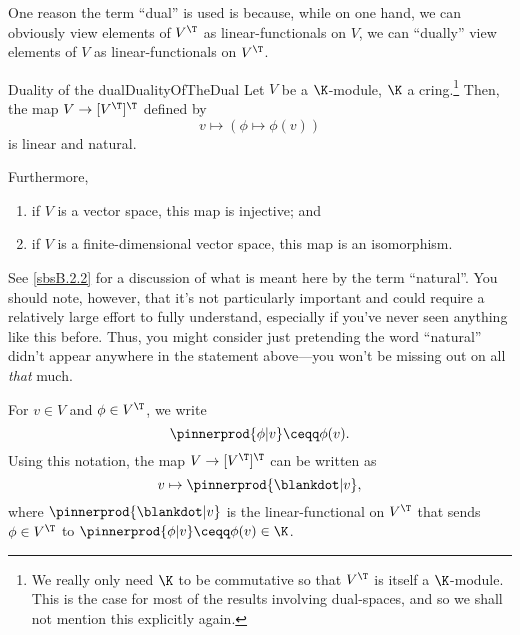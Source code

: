 One reason the term ``dual'' is used is because, while on one hand, we can obviously view elements of $V^{\T}$ as linear-functionals on $V$, we can ``dually'' view elements of $V$ as linear-functionals on $V^{\T}$.
\begin{thm}{Duality of the dual}{DualityOfTheDual}
	Let $V$ be a $\K$-module, $\K$ a cring.\footnote{We really only need $\K$ to be commutative so that $V^{\T}$ is itself a $\K$-module.  This is the case for most of the results involving dual-spaces, and so we shall not mention this explicitly again.}  Then, the map $V\rightarrow [V^{\T}]^{\T}$ defined by
	\begin{equation}
		v\mapsto (\phi \mapsto \phi (v))
	\end{equation}
	is linear and natural.
	
	Furthermore,
	\begin{enumerate}
		\item \label{DualityOfTheDual(i)}if $V$ is a vector space, this map is injective; and
		\item \label{DualityOfTheDual(ii)}if $V$ is a finite-dimensional vector space, this map is an isomorphism.
	\end{enumerate}
	\begin{rmk}
		See \cref{sbsB.2.2} for a discussion of what is meant here by the term ``natural''.  You should note, however, that it's not particularly important and could require a relatively large effort to fully understand, especially if you've never seen anything like this before.  Thus, you might consider just pretending the word ``natural'' didn't appear anywhere in the statement above---you won't be missing out on all \emph{that} much.
	\end{rmk}
	\begin{rmk}
		For $v\in V$ and $\phi \in V^{\T}$, we write
		\begin{equation}
		\pinnerprod{\phi |v}\ceqq \phi (v).
		\end{equation}
		Using this notation, the map $V\rightarrow [V^{\T}]^{\T}$ can be written as
		\begin{equation}
		v\mapsto \pinnerprod{\blankdot |v},
		\end{equation}
		where $\pinnerprod{\blankdot |v}$ is the linear-functional on $V^{\T}$ that sends $\phi \in V^{\T}$ to $\pinnerprod{\phi |v}\ceqq \phi (v)\in \K$.
		

\end{rmk}
\end{thm}

